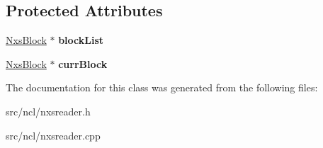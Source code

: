\subsection*{Protected Attributes}
\begin{DoxyCompactItemize}
\item 
\hypertarget{classNxsReader_a655db3db8fbd4ea24a02a9aef3fc872b}{
\hyperlink{classNxsBlock}{NxsBlock} $\ast$ {\bfseries blockList}}
\label{classNxsReader_a655db3db8fbd4ea24a02a9aef3fc872b}

\item 
\hypertarget{classNxsReader_a97928eea97d0cac263162875dedd7afb}{
\hyperlink{classNxsBlock}{NxsBlock} $\ast$ {\bfseries currBlock}}
\label{classNxsReader_a97928eea97d0cac263162875dedd7afb}

\end{DoxyCompactItemize}


The documentation for this class was generated from the following files:\begin{DoxyCompactItemize}
\item 
src/ncl/nxsreader.h\item 
src/ncl/nxsreader.cpp\end{DoxyCompactItemize}
